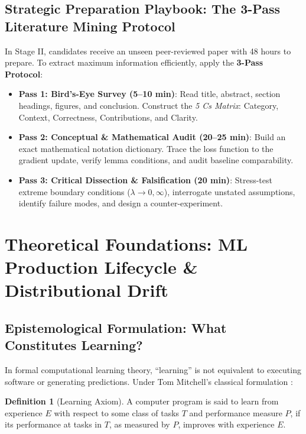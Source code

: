 \documentclass[11pt,a4paper]{article}
\theoremstyle{definition}
\newtheorem{definition}{Definition}[section]
\theoremstyle{plain}
\theoremstyle{remark}
\begin{document}
\subsection{Strategic Preparation Playbook: The 3-Pass Literature Mining Protocol}
In Stage II, candidates receive an unseen peer-reviewed paper with 48 hours to prepare. To extract maximum information efficiently, apply the \textbf{3-Pass Protocol}:
\begin{itemize}
    \item \textbf{Pass 1: Bird's-Eye Survey (5--10 min)}: Read title, abstract, section headings, figures, and conclusion. Construct the \emph{5 Cs Matrix}: Category, Context, Correctness, Contributions, and Clarity.
    \item \textbf{Pass 2: Conceptual \& Mathematical Audit (20--25 min)}: Build an exact mathematical notation dictionary. Trace the loss function to the gradient update, verify lemma conditions, and audit baseline comparability.
    \item \textbf{Pass 3: Critical Dissection \& Falsification (20 min)}: Stress-test extreme boundary conditions ($\lambda \to 0, \infty$), interrogate unstated assumptions, identify failure modes, and design a counter-experiment.
\end{itemize}

\section{Theoretical Foundations: ML Production Lifecycle \& Distributional Drift}

\subsection{Epistemological Formulation: What Constitutes Learning?}
In formal computational learning theory, ``learning'' is not equivalent to executing software or generating predictions. Under Tom Mitchell's classical formulation \cite{mitchell1997machine}:
\begin{definition}[Learning Axiom]
A computer program is said to learn from experience $E$ with respect to some class of tasks $T$ and performance measure $P$, if its performance at tasks in $T$, as measured by $P$, improves with experience $E$.
\end{definition}
\end{document}
